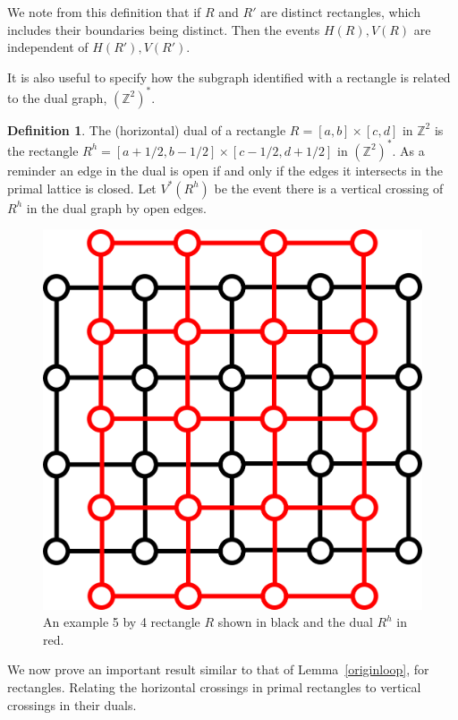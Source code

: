 \documentclass[a4paper,11pt]{article}
\theoremstyle{definition}
\newtheorem{definition}[theorem]{Definition}
\newcommand{\ints}{\mathbb{Z}}
\newcommand{\ztwodual}{(\ints^2)^*}
\begin{document}
We note from this definition that if $R$ and $R'$ are distinct rectangles, which includes their boundaries being distinct. Then the events $H(R),V(R)$ are independent of $H(R'),V(R')$.

It is also useful to specify how the subgraph identified with a rectangle is related to the dual graph, $\ztwodual$.
\begin{definition}
	The (horizontal) dual of a rectangle $R = [a,b]\times[c,d]$ in $\ints^2$ is the rectangle $R^h = [a+1/2,b-1/2]\times[c-1/2,d+1/2]$ in $\ztwodual$. As a reminder an edge in the dual is open if and only if the edges it intersects in the primal lattice is closed.
	Let $V^*(R^h)$ be the event there is a vertical crossing of $R^h$ in the dual graph by open edges.
\end{definition}

\begin{figure}
	\centering
	\includegraphics[scale=0.6]{drawings/RectangleDual2.png}
	\caption{An example 5 by 4 rectangle $R$ shown in black and the dual $R^h$ in red.}
	\label{fig:rectangle}
\end{figure}

We now prove an important result similar to that of Lemma~\ref*{originloop}, for rectangles. Relating the horizontal crossings in primal rectangles to vertical crossings in their duals.
\end{document}
